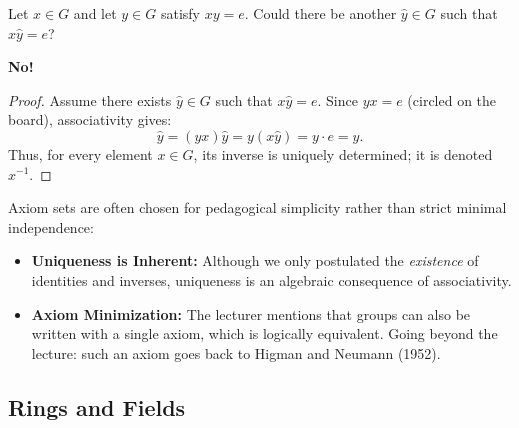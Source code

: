 \begin{content}
\begin{question}
Let $x \in G$ and let $y \in G$ satisfy $xy = e$. Could there be another $\hat{y} \in G$ such that $x\hat{y} = e$?
\end{question}

\begin{answer}
\textbf{No!}
\begin{proof}
Assume there exists $\hat{y} \in G$ such that $x\hat{y} = e$. Since $yx = e$ (circled on the board), associativity gives:
\[
\hat{y} = (yx)\hat{y} = y(x\hat{y}) = y \cdot e = y.
\]
Thus, for every element $x \in G$, its inverse is uniquely determined; it is denoted $x^{-1}$.
\end{proof}
\end{answer}

\begin{steps}
Axiom sets are often chosen for pedagogical simplicity rather than strict minimal independence:
\begin{itemize}
    \item \textbf{Uniqueness is Inherent:} Although we only postulated the \emph{existence} of identities and inverses, uniqueness is an algebraic consequence of associativity.
    \item \textbf{Axiom Minimization:} The lecturer mentions that groups can also be written with a single axiom, which is logically equivalent. Going beyond the lecture: such an axiom goes back to Higman and Neumann (1952).
\end{itemize}
\end{steps}
\end{content}

\subsection{Rings and Fields}

